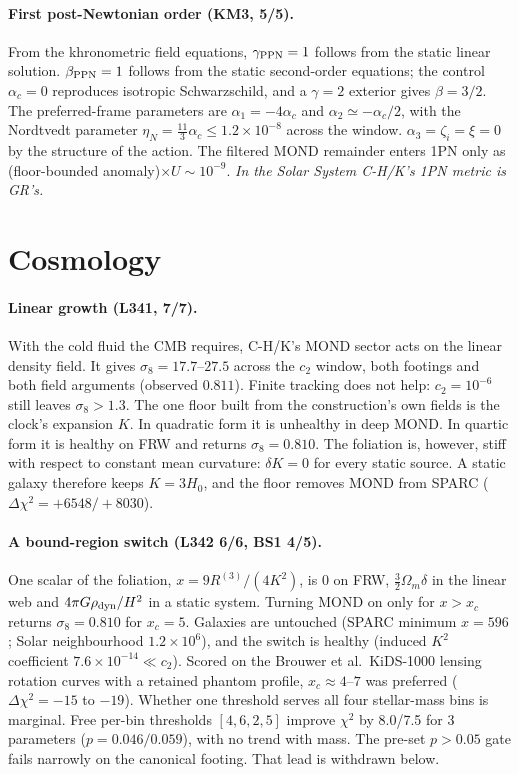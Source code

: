\documentclass[10pt]{article}
\begin{document}
\paragraph{First post-Newtonian order (KM3, 5/5).}
From the khronometric field equations, $\gamma_{\rm PPN}=1$ follows from the static linear solution. $\beta_{\rm PPN}=1$ follows from the static second-order equations; the control $\alpha_c=0$ reproduces isotropic Schwarzschild, and a $\gamma=2$ exterior gives $\beta=3/2$.
The preferred-frame parameters are $\alpha_1=-4\alpha_c$ and $\alpha_2\simeq-\alpha_c/2$, with the Nordtvedt parameter $\eta_N=\tfrac{11}{3}\alpha_c\leq1.2\times10^{-8}$ across the window. $\alpha_3=\zeta_i=\xi=0$ by the structure of the action.
The filtered MOND remainder enters 1PN only as (floor-bounded anomaly)$\times U\sim10^{-9}$. \emph{In the Solar System C-H/K's 1PN metric is GR's.}

\section{Cosmology}\label{sec:cosmo}

\paragraph{Linear growth (L341, 7/7).}
With the cold fluid the CMB requires, C-H/K's MOND sector acts on the linear density field. It gives $\sigma_8=17.7$--$27.5$ across the $c_2$ window, both footings and both field arguments (observed $0.811$). Finite tracking does not help: $c_2=10^{-6}$ still leaves $\sigma_8>1.3$.
The one floor built from the construction's own fields is the clock's expansion $K$. In quadratic form it is unhealthy in deep MOND. In quartic form it is healthy on FRW and returns $\sigma_8=0.810$.
The foliation is, however, stiff with respect to constant mean curvature: $\delta K=0$ for every static source. A static galaxy therefore keeps $K=3H_0$, and the floor removes MOND from SPARC ($\Delta\chi^2=+6548/+8030$).

\paragraph{A bound-region switch (L342 6/6, BS1 4/5).}
One scalar of the foliation, $x=9R^{(3)}/(4K^2)$, is 0 on FRW, $\tfrac32\Omega_m\delta$ in the linear web and $4\pi G\rho_{\rm dyn}/H^2$ in a static system. Turning MOND on only for $x>x_c$ returns $\sigma_8=0.810$ for $x_c=5$. Galaxies are untouched (SPARC minimum $x=596$; Solar neighbourhood $1.2\times10^6$), and the switch is healthy (induced $K^2$ coefficient $7.6\times10^{-14}\ll c_2$).
Scored on the Brouwer et al.\ KiDS-1000 lensing rotation curves with a retained phantom profile, $x_c\approx4$--$7$ was preferred ($\Delta\chi^2=-15$ to $-19$).
Whether one threshold serves all four stellar-mass bins is marginal. Free per-bin thresholds $[4,6,2,5]$ improve $\chi^2$ by 8.0/7.5 for 3 parameters ($p=0.046/0.059$), with no trend with mass. The pre-set $p>0.05$ gate fails narrowly on the canonical footing.
That lead is withdrawn below.
\end{document}

